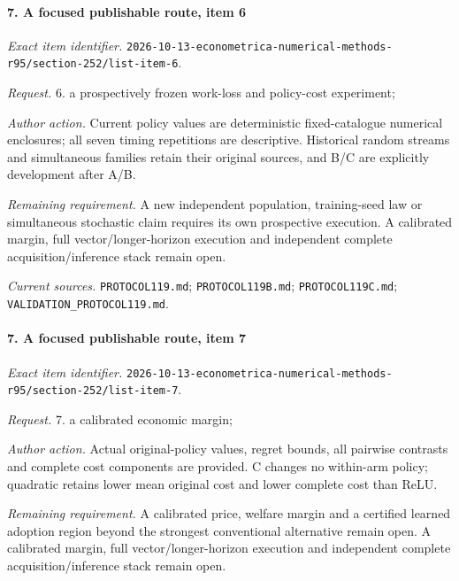 \paragraph{7. A focused publishable route, item 6}

\emph{Exact item identifier.} \nolinkurl{2026-10-13-econometrica-numerical-methods-r95/section-252/list-item-6}.

\par\emph{Request.} 6. a prospectively frozen work-loss and policy-cost experiment;

\par\emph{Author action.} Current policy values are deterministic fixed-catalogue numerical enclosures; all seven timing repetitions are descriptive. Historical random streams and simultaneous families retain their original sources, and B/\allowbreak{}C are explicitly development after A/\allowbreak{}B.

\par\emph{Remaining requirement.} A new independent population, training-seed law or simultaneous stochastic claim requires its own prospective execution. A calibrated margin, full vector/\allowbreak{}longer-horizon execution and independent complete acquisition/\allowbreak{}inference stack remain open.

\par\emph{Current sources.} \nolinkurl{PROTOCOL119.md}; \nolinkurl{PROTOCOL119B.md}; \nolinkurl{PROTOCOL119C.md}; \nolinkurl{VALIDATION_PROTOCOL119.md}.

\paragraph{7. A focused publishable route, item 7}

\emph{Exact item identifier.} \nolinkurl{2026-10-13-econometrica-numerical-methods-r95/section-252/list-item-7}.

\par\emph{Request.} 7. a calibrated economic margin;

\par\emph{Author action.} Actual original-policy values, regret bounds, all pairwise contrasts and complete cost components are provided. C changes no within-arm policy; quadratic retains lower mean original cost and lower complete cost than ReLU.

\par\emph{Remaining requirement.} A calibrated price, welfare margin and a certified learned adoption region beyond the strongest conventional alternative remain open. A calibrated margin, full vector/\allowbreak{}longer-horizon execution and independent complete acquisition/\allowbreak{}inference stack remain open.

